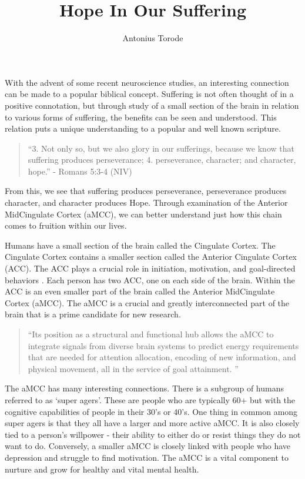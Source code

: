 \documentclass[9.5pt]{article}
\title{Hope In Our Suffering}
\author{Antonius Torode}
\begin{document}
\maketitle
\thispagestyle{fancy}

\begin{multicols}{2}

With the advent of some recent neuroscience studies, an interesting connection can be made to a popular biblical concept. Suffering is not often thought of in a positive connotation, but through study of a small section of the brain in relation to various forms of suffering, the benefits can be seen and understood. This relation puts a unique understanding to a popular and well known scripture.

\begin{quotation}
``3. Not only so, but we also glory in our sufferings, because we know that suffering produces perseverance; 4. perseverance, character; and character, hope.'' - Romans 5:3-4 (NIV)
\end{quotation}

From this, we see that suffering produces perseverance, perseverance produces character, and character produces Hope. Through examination of the Anterior MidCingulate Cortex (aMCC), we can better understand just how this chain comes to fruition within our lives.

Humans have a small section of the brain called the Cingulate Cortex. The Cingulate Cortex contains a smaller section called the Anterior Cingulate Cortex (ACC). The ACC plays a crucial role in initiation, motivation, and goal-directed behaviors \cite{ACC}. Each person has two ACC, one on each side of the brain. Within the ACC is an even smaller part of the brain called the Anterior MidCingulate Cortex (aMCC). The aMCC is a crucial and greatly interconnected part of the brain that is a prime candidate for new research.

\begin{quotation}
``Its position as a structural and functional hub allows the aMCC to integrate signals from diverse brain systems to predict energy requirements that are needed for attention allocation, encoding of new information, and physical movement, all in the service of goal attainment. \cite{aMCC}''
\end{quotation}

The aMCC has many interesting connections. There is a subgroup of humans referred to as `super agers'. These are people who are typically 60+ but with the cognitive capabilities of people in their 30's or 40's. One thing in common among super agers is that they all have a larger and more active aMCC. It is also closely tied to a person's willpower - their ability to either do or resist things they do not want to do. Conversely, a smaller aMCC is closely linked with people who have depression and struggle to find motivation. The aMCC is a vital component to nurture and grow for healthy and vital mental health. 


\end{multicols}
\end{document}
